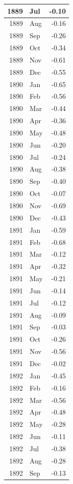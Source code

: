 \documentclass[
]{article}
\begin{document}
\begin{table}[H]
\begin{tabular}[t]{r|l|r}
\hline
1889 & Jul & -0.10\\
\hline
1889 & Aug & -0.16\\
\hline
1889 & Sep & -0.26\\
\hline
1889 & Oct & -0.34\\
\hline
1889 & Nov & -0.61\\
\hline
1889 & Dec & -0.55\\
\hline
1890 & Jan & -0.65\\
\hline
1890 & Feb & -0.56\\
\hline
1890 & Mar & -0.44\\
\hline
1890 & Apr & -0.36\\
\hline
1890 & May & -0.48\\
\hline
1890 & Jun & -0.20\\
\hline
1890 & Jul & -0.24\\
\hline
1890 & Aug & -0.38\\
\hline
1890 & Sep & -0.40\\
\hline
1890 & Oct & -0.07\\
\hline
1890 & Nov & -0.69\\
\hline
1890 & Dec & -0.43\\
\hline
1891 & Jan & -0.59\\
\hline
1891 & Feb & -0.68\\
\hline
1891 & Mar & -0.12\\
\hline
1891 & Apr & -0.32\\
\hline
1891 & May & -0.21\\
\hline
1891 & Jun & -0.14\\
\hline
1891 & Jul & -0.12\\
\hline
1891 & Aug & -0.09\\
\hline
1891 & Sep & -0.03\\
\hline
1891 & Oct & -0.26\\
\hline
1891 & Nov & -0.56\\
\hline
1891 & Dec & -0.02\\
\hline
1892 & Jan & -0.45\\
\hline
1892 & Feb & -0.16\\
\hline
1892 & Mar & -0.56\\
\hline
1892 & Apr & -0.48\\
\hline
1892 & May & -0.28\\
\hline
1892 & Jun & -0.11\\
\hline
1892 & Jul & -0.38\\
\hline
1892 & Aug & -0.28\\
\hline
1892 & Sep & -0.13\\

\end{tabular}
\end{table}
\end{document}
